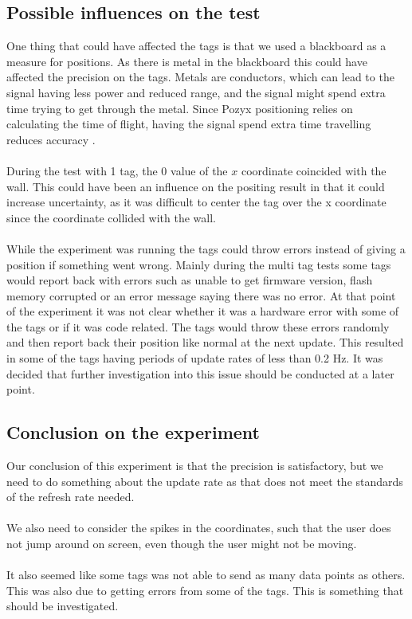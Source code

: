 \subsection{Possible influences on the test}
One thing that could have affected the tags is that we used a blackboard as a measure for positions. 
As there is metal in the blackboard this could have affected the precision on the tags.
Metals are conductors, which can lead to the signal having less power and reduced range, and the signal might spend extra time trying to get through the metal.
Since Pozyx positioning relies on calculating the time of flight, having the signal spend extra time travelling reduces accuracy \cite{pozyx-UWBObstacles}. 
\\\\
During the test with 1 tag, the 0 value of the $x$ coordinate coincided with the wall. 
This could have been an influence on the positing result in that it could increase uncertainty, as it was difficult to center the tag over the x coordinate since the coordinate collided with the wall.
\\\\
While the experiment was running the tags could throw errors instead of giving a position if something went wrong.
Mainly during the multi tag tests some tags would report back with errors such as unable to get firmware version, flash memory corrupted or an error message saying there was no error.
At that point of the experiment it was not clear whether it was a hardware error with some of the tags or if it was code related.
The tags would throw these errors randomly and then report back their position like normal at the next update.
This resulted in some of the tags having periods of update rates of less than 0.2 Hz.
It was decided that further investigation into this issue should be conducted at a later point.

\subsection{Conclusion on the experiment}
Our conclusion of this experiment is that the precision is satisfactory, but we need to do something about the update rate as that does not meet the standards of the refresh rate needed.
\\\\
We also need to consider the spikes in the coordinates, such that the user does not jump around on screen, even though the user might not be moving.
\\\\
It also seemed like some tags was not able to send as many data points as others. This was also due to getting errors from some of the tags.
This is something that should be investigated.
